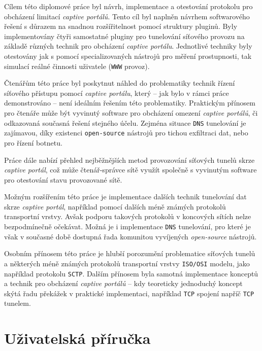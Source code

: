 \documentclass[thesis=M,czech]{FITthesis}[2012/10/20]
\begin{document}
\begin{conclusion}
	Cílem této diplomové práce byl návrh, implementace a otestování protokolu pro obcházení limitací \textit{captive portálů}. Tento cíl byl naplněn návrhem softwarového řešení s důrazem na snadnou rozšířitelnost pomocí struktury pluginů. Byly implementovány čtyři samostatné pluginy pro tunelování síťového provozu na základě různých technik pro obcházení \textit{captive portálu}. Jednotlivé techniky byly otestovány jak s pomocí specializovaných nástrojů pro měření prostupnosti, tak simulací reálné činnosti uživatele (\texttt{WWW} provoz).
	
	Čtenářům této práce byl poskytnut náhled do problematiky technik řízení síťového přístupu pomocí \textit{captive portálu}, který -- jak bylo v rámci práce demonstrováno -- není ideálním řešením této problematiky. Praktickým přínosem pro čtenáře může být vyvinutý software pro obcházení omezení \textit{captive portálů}, či odkazovaná současná řešení stejného účelu. Zejména situace \texttt{DNS} tunelování je zajímavou, díky existenci \texttt{open-source} nástrojů pro tichou exfiltraci dat, nebo pro řízení botnetu.
	
	Práce dále nabízí přehled nejběžnějších metod provozování síťových tunelů skrze \textit{captive portál}, což může čtenář-správce sítě využít společně s vyvinutým software pro otestování stavu provozované sítě.
	
	Možným rozšířením této práce je implementace dalších technik tunelování dat skrze \textit{captive portál}, například pomocí dalších méně známých protokolů transportní vrstvy. Avšak podporu takových protokolů v koncových sítích nelze bezpodmínečně očekávat. Možná je i implementace \texttt{DNS} tunelování, pro které je však v současné době dostupná řada komunitou vyvíjených \textit{open-source} nástrojů.
	
	Osobním přínosem této práce je hlubší porozumění problematice síťových tunelů a některých méně známých protokolů transportní vrstvy \texttt{ISO/OSI} modelu, jako například protokolu \texttt{SCTP}. Dalším přínosem byla samotná implementace konceptů a technik pro obcházení \textit{captive portálů} -- kdy teoreticky jednoduchý koncept skýtá řadu překážek v praktické implementaci, například \texttt{TCP} spojení napříč \texttt{TCP} tunelem.
\end{conclusion}




\appendix

\chapter{Uživatelská příručka}
\end{document}
